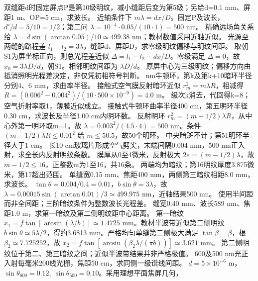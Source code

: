 \problemtext 双缝距d时固定屏点P是第10级明纹，减小缝距后变为第5级；另给d=0.1 mm、屏距1 m、OP=5 cm，求波长。
\workings 近轴条件下 $m\lambda=dx/D$。固定P及波长，$d'/d=5/10=1/2$；第二问 $\lambda=10^{-4}\cdot0.05/(10\cdot1)=500$ nm。
\crosscheck 精确远场角关系给 $\lambda=d\sin(\arctan0.05)/10\simeq499.38$ nm；教材数值采用近轴近似。
\problemtext 光源至两缝的路程差 $l_1-l_2=3\lambda$，缝距d、屏距D，求零级明纹偏移与明纹间距。
\workings 取朝S1为屏坐标正向，则总光程差近似 $\Delta=l_1-l_2-dx/D$。零级满足 $\Delta=0$，故 $x_0=3\lambda D/d$，朝S1。相邻明纹间距为 $\lambda D/d$。
\crosscheck 原屏中心为三级明纹；偏移方向由抵消照明光程差决定，非仅凭初相符号判断。
 nm牛顿环，第k及第k+10暗环半径分别4、6 mm，求曲率半径。
\workings 接触式空气膜反射暗环近似 $r_m^2=m\lambda R$，相减得 $R=(0.006^2-0.004^2)/(10\cdot500\times10^{-9})=4.0$ m。
\crosscheck 级次k消去，代回得k=8；空气折射率取1，薄膜近似成立。
\problemtext 接触式牛顿环曲率半径400 cm，第五明环半径0.30 cm，求波长及半径1.00 cm内明环数。
\workings 反射明环 $r_m^2=(m-1/2)\lambda R$，从中心外第一明环取m=1。故 $\lambda=0.003^2/(4.5\cdot4)=500$ nm。条件 $(m-1/2)\lambda R\le0.01^2$ 给 $m\le50.5$，故50个明环。
\crosscheck 中央暗斑不计；第51明环半径大于1 cm。
\problemtext 长10 cm玻璃片形成空气劈尖，末端间隔0.004 mm，500 nm正入射，求全长内反射明纹条数。
\workings 膜厚从0至4微米，反射极大 $2e=(m-1/2)\lambda$，故 $m-1/2\le16$，正整数m为1至16，共16条。
\crosscheck 两端均为暗纹；第16明纹厚度3.875微米，第17超出范围。
\problemtext 单缝宽0.15 mm、焦距400 mm，两侧第三暗纹相距8.0 mm，求波长。
\workings $\tan\theta=0.004/0.4=0.01$，$b\sin\theta=3\lambda$，故 $\lambda=0.00015\sin(\arctan0.01)/3\simeq499.975$ nm，近轴结果500 nm。
\crosscheck 使用半间距而非全间距；三阶暗纹条件为整数波长光程差。
\problemtext 缝宽0.40 mm、波长589 nm、焦距1.0 m，求第一暗纹及第二侧明纹距中心距离。
\workings 第一暗纹 $x_1=f\tan[\arcsin(\lambda/b)]\simeq1.4725$ mm。教材半波带近似第二侧明纹 $b\sin\theta\simeq5\lambda/2$，得约3.6813 mm。严格均匀单缝第二侧极大满足 $\tan\beta=\beta$，根 $\beta_2\simeq7.725252$，故 $x_2=f\tan[\arcsin(\beta_2\lambda/(\pi b))]\simeq3.621$ mm。
\crosscheck 第二侧明纹位于第二、第三暗纹之间；近似半波带结果并非严格极值。
\problemtext 600及500 nm光正入射每毫米200线光栅，焦距50 cm，求同侧一级谱线间距。
\workings $d=5\times10^{-6}$ m，$\sin\theta_{600}=0.12,\ \sin\theta_{500}=0.10$。采用理想平面焦屏几何，
